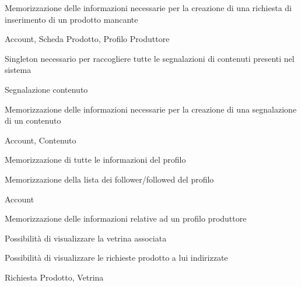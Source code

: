 
{\begin{itemWork}
	\item Memorizzazione delle informazioni necessarie per la creazione di una richiesta di inserimento di un prodotto mancante
\end{itemWork}}
{\begin{itemWork}
	\item Account, Scheda Prodotto, Profilo Produttore
\end{itemWork}}


{\begin{itemWork}
	\item Singleton necessario per raccogliere tutte le segnalazioni di contenuti presenti nel sistema
\end{itemWork}}
{\begin{itemWork}
	\item Segnalazione contenuto
\end{itemWork}}


{\begin{itemWork}
	\item Memorizzazione delle informazioni necessarie per la creazione di una segnalazione di un contenuto
\end{itemWork}}
{\begin{itemWork}
	\item Account, Contenuto
\end{itemWork}}


{\begin{itemWork}
	\item Memorizzazione di tutte le informazioni del profilo
	\item Memorizzazione della lista dei follower/followed del profilo
\end{itemWork}}
{\begin{itemWork}
	\item Account
\end{itemWork}}


{\begin{itemWork}
	\item Memorizzazione delle informazioni relative ad un profilo produttore
	\item Possibilità di visualizzare la vetrina associata
	\item Possibilità di visualizzare le richieste prodotto a lui indirizzate
\end{itemWork}}
{\begin{itemWork}
	\item Richiesta Prodotto, Vetrina
\end{itemWork}}

